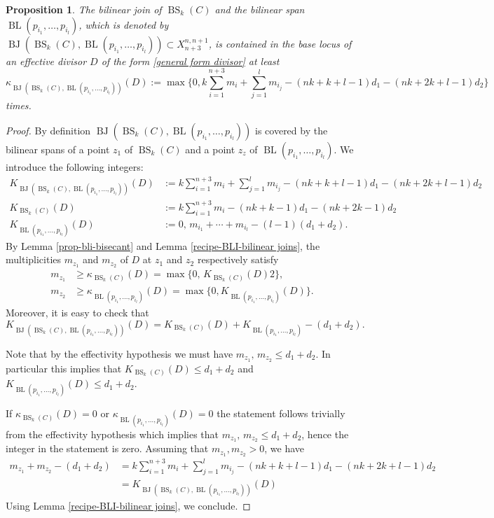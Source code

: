 \documentclass[a4paper,11pt]{article}
\newtheorem{proposition}[theorem]{Proposition}
\newcommand{\BL}{\operatorname{BL}}
\newcommand{\BJ}{\operatorname{BJ}}
\newcommand{\BS}{\operatorname{BS}}
\begin{document}
\begin{proposition}\label{prop-bli-bilinearjoins}
The bilinear join  of $\BS_k(C)$ and the bilinear span $\BL(p_{i_1},\dots,p_{i_l})$, which is denoted by $\BJ(\BS_k(C),\BL(p_{i_1},\dots,p_{i_l}))\subset X^{n,n+1}_{n+3}$, 
is contained  in the base locus of an effective divisor $D$ of the form \eqref{general form divisor} at least 
\[
\kappa_{\BJ(\BS_k(C),\BL(p_{i_1},\dots,p_{i_l}))}(D):=\max\{0, k\sum_{i=1}^{n+3}m_i+\sum_{j=1}^lm_{i_j}-(nk+k+l-1)d_1-(nk+2k+l-1)d_2\}
\] times. 
\end{proposition}
\begin{proof}
By definition $\BJ(\BS_k(C),\BL(p_{i_1},\dots,p_{i_l}))$ is covered by the bilinear spans of a point $z_1$ of $\BS_k(C)$ and a point $z_z$ of $\BL(p_{i_1},\dots,p_{i_l})$.
We introduce the following integers:
\begin{align*}
K_{\BJ(\BS_k(C),\BL(p_{i_1},\dots,p_{i_l}))}(D)&:= k\sum_{i=1}^{n+3}m_i+\sum_{j=1}^lm_{i_j}-(nk+k+l-1)d_1-(nk+2k+l-1)d_2\\
K_{\BS_k(C)}(D) &:= k\sum_{i=1}^{n+3}m_i-(nk+k-1)d_1-(nk+2k-1)d_2\\
K_{\BL(p_{i_1},\dots,p_{i_l})}(D) &:= 0, \, m_{i_1}+\cdots+m_{i_l}-(l-1)(d_1+d_2).
\end{align*}
By Lemma \ref{prop-bli-bisecant} and Lemma  \ref{recipe-BLI-bilinear joins}, the multiplicities $m_{z_1}$ and $m_{z_2}$ of $D$ at $z_1$ and $z_2$ respectively satisfy
\begin{align*}
m_{z_1} &\geq \kappa_{\BS_k(C)}(D) = \max\{0, \, K_{\BS_k(C)}(D)2\},\\
m_{z_2} &\geq \kappa_{\BL(p_{i_1},\dots,p_{i_l})}(D) = \max\{0, K_{\BL(p_{i_1},\dots,p_{i_l})}(D)\}.
\end{align*}
Moreover, it is easy to check that $$K_{\BJ(\BS_k(C),\BL(p_{i_1},\dots,p_{i_l}))}(D)=K_{\BS_k(C)}(D)+K_{\BL(p_{i_1},\dots,p_{i_l})}-(d_1+d_2).$$

Note that by the effectivity hypothesis we must have $m_{z_1}, \, m_{z_2} \leq d_1+d_2$. In particular this implies that $K_{\BS_k(C)}(D) \leq d_1+d_2$ and  $K_{\BL(p_{i_1},\dots,p_{i_l})}(D) \leq d_1+d_2$.

If $\kappa_{\BS_k(C)}(D)=0$ or $\kappa_{\BL(p_{i_1},\dots,p_{i_l})}(D)=0$ the statement follows trivially from the effectivity hypothesis which implies that $m_{z_1}, \, m_{z_2}\le d_1+d_2$, hence the integer in the statement is zero.
Assuming that $m_{z_1},m_{z_2}>0$, we have 
\begin{align*}
m_{z_1}+m_{z_2}-(d_1+d_2)
&=k\sum_{i=1}^{n+3}m_i+\sum_{j=1}^lm_{i_j}-(nk+k+l-1)d_1-(nk+2k+l-1)d_2\\
&=K_{\BJ(\BS_k(C),\BL(p_{i_1},\dots,p_{i_l}))}(D)
\end{align*}
Using Lemma \ref{recipe-BLI-bilinear joins}, we conclude.
\end{proof}
\end{document}
